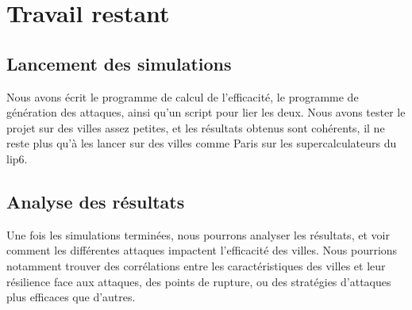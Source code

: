 \section{Travail restant}
\subsection{Lancement des simulations}
Nous avons écrit le programme de calcul de l'efficacité, le programme de génération des attaques, ainsi qu'un script pour lier les deux.
Nous avons tester le projet sur des villes assez petites, et les résultats obtenus sont cohérents, il ne reste plus qu'à les lancer sur des villes comme Paris sur les supercalculateurs du lip6.
\subsection{Analyse des résultats}
Une fois les simulations terminées, nous pourrons analyser les résultats, et voir comment les différentes attaques impactent l'efficacité des villes.
Nous pourrions notamment trouver des corrélations entre les caractéristiques des villes et leur résilience face aux attaques, des points de rupture, ou des stratégies d'attaques plus efficaces que d'autres.
